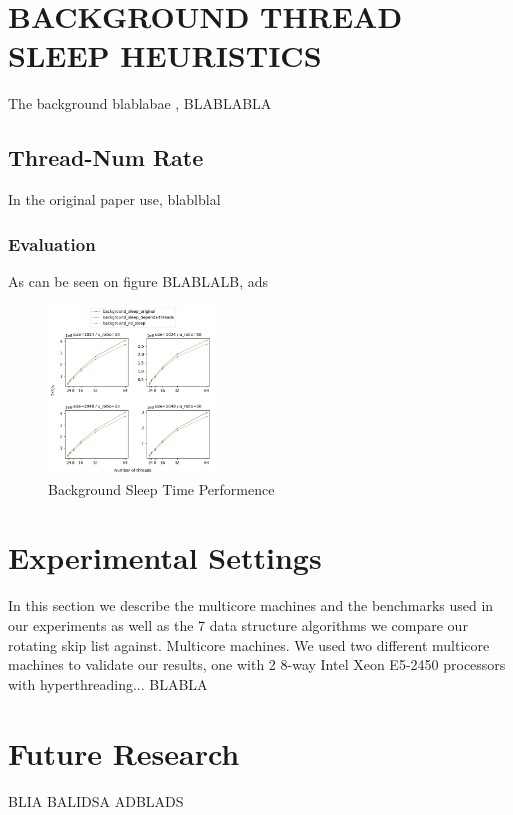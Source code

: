\documentclass{article}
\begin{document}
\section{BACKGROUND THREAD SLEEP HEURISTICS}
\label{sec:bts}

The background blablabae , BLABLABLA

\subsection{Thread-Num Rate}
\label{ssec:dsrs}

In the original paper use, blablblal

\subsubsection{Evaluation}
\label{sssec:dsrs-evl}

As can be seen on figure BLABLALB, ads

\begin{figure}
	\caption{Background Sleep Time Performence}
	\centering
	\includegraphics[width=0.4\textwidth]{sleep_plot}
\end{figure}


\section{Experimental Settings}
\label{sec:exp}

In this section we describe the multicore machines and the benchmarks used in our experiments as well as the 7 data structure algorithms we compare our rotating skip list against.
Multicore machines. We used two different multicore machines to validate our results, one with 2 8-way Intel Xeon E5-2450 processors with hyperthreading... BLABLA


\section{Future Research}
\label{sec:foot}

BLIA BALIDSA ADBLADS






\end{document}
